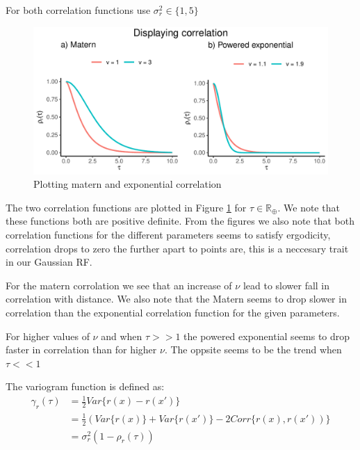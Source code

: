 \documentclass[]{article}
\begin{document}
For both correlation functions use
\(\sigma^2_r \in \lbrace 1, 5\rbrace\)

\begin{figure}
\centering
\includegraphics{Exercise-1_files/figure-latex/fig1a1-1.pdf}
\caption{\label{fig:fig1a1} Plotting matern and exponential correlation}
\end{figure}

The two correlation functions are plotted in Figure \ref{fig:fig1a1} for
\(\tau \in \mathbb{R}_\oplus\). We note that these functions both are
positive definite. From the figures we also note that both correlation
functions for the different parameters seems to satisfy ergodicity,
correlation drops to zero the further apart to points are, this is a
neccesary trait in our Gaussian RF.

For the matern corrolation we see that an increase of \(\nu\) lead to
slower fall in correlation with distance. We also note that the Matern
seems to drop slower in correlation than the exponential correlation
function for the given parameters.

For higher values of \(\nu\) and when \(\tau >> 1\) the powered
exponential seems to drop faster in correlation than for higher \(\nu\).
The oppsite seems to be the trend when \(\tau << 1\)

The variogram function is defined as:
\begin{equation}\label{eq:variogram}
    \begin{split}
        \gamma_r(\tau)  &= \frac{1}{2} Var\lbrace r(x) - r(x') \rbrace \\
        &= \frac{1}{2} (Var\lbrace r(x) \rbrace + Var\lbrace r(x') \rbrace - 2 Corr\lbrace r(x), r(x')) \rbrace\\
        &=\sigma_r^2(1-\rho_r(\tau))
    \end{split}
\end{equation}
\end{document}
